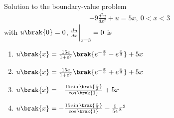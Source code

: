\item Solution to the boundary-value problem
\begin{align*}
    -9\frac{d^2u}{dx^2} + u = 5x,\ 0 < x <3
\end{align*}
with $u\brak{0} = 0$, $\frac{du}{dx}\bigg{|}_{x=3} = 0$ is
\begin{enumerate}
    \item $u\brak{x} = \frac{15e}{1+e^2}\brak{e^{-\frac{x}{3}} - e^{\frac{x}{3}}} + 5x$
    \item $u\brak{x} = \frac{15e}{1+e^2}\brak{e^{-\frac{x}{3}} + e^{\frac{x}{3}}} + 5x$
    \item $u\brak{x} = -\frac{15\sin\brak{\frac{x}{3}}}{\cos\brak{1}} + 5x$
    \item $u\brak{x} = -\frac{15\sin\brak{\frac{x}{3}}}{\cos\brak{1}} - \frac{5}{54}x^3$ \\
\end{enumerate}
